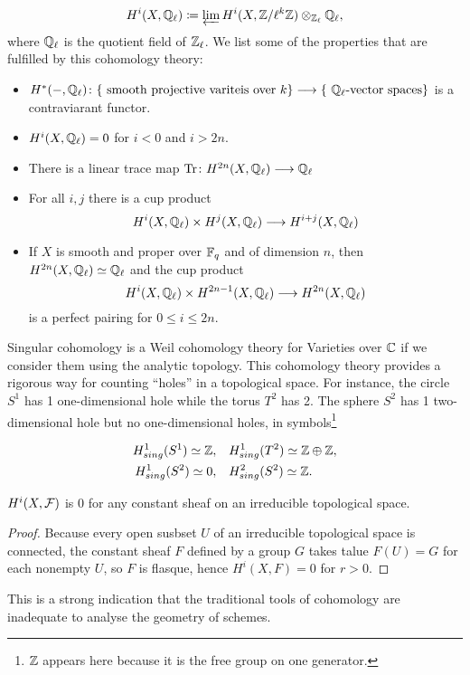 \[
	H^i(X,\mathbb{Q}_\ell) \coloneqq \varprojlim H^i(X, \mathbb{Z}/\ell^k \mathbb{Z}) \otimes_{\mathbb{Z}_\ell} \mathbb{Q}_\ell,
\]
where $\mathbb{Q}_\ell$ is the quotient field of $\mathbb{Z}_\ell$. We list some of the properties that are fulfilled by this cohomology theory:

\begin{itemize}
	\item $H^*(-, \mathbb{Q}_\ell) \colon \{ \text{ smooth projective variteis over } k \} \longrightarrow \{\text{ $\mathbb{Q}_\ell$-vector spaces}\}$
	      is a contraviarant functor.
	\item $H^i(X, \mathbb{Q}_\ell) = 0$ for $i<0$ and $i>2n$.
	\item There is a linear trace map $\operatorname{Tr} \colon H^{2n}(X, \mathbb{Q}_\ell) \longrightarrow \mathbb{Q}_\ell$
	\item For all $i,j$ there is a cup product
	      \[
		      H^i(X, \mathbb{Q}_\ell) \times H^j(X, \mathbb{Q}_\ell) \longrightarrow H^{i+j}(X, \mathbb{Q}_\ell)
	      \]
	\item If $X$ is smooth and proper over $\mathbb{F}_q$ and of dimension $n$, then $H^{2n}(X, \mathbb{Q}_\ell) \simeq \mathbb{Q}_\ell$ and the cup product
	      \[ H^i(X, \mathbb{Q}_\ell) \times H^{2n-1}(X, \mathbb{Q}_\ell) \longrightarrow H^{2n}(X, \mathbb{Q}_\ell)
	      \]
	      is a perfect pairing for $0 \le i \le 2n$.
\end{itemize}

Singular cohomology is a Weil cohomology theory for Varieties over $\mathbb{C}$ if we consider them using the analytic topology. This cohomology theory provides a rigorous way for counting ``holes'' in a topological space. For instance, the circle $S^1$ has 1 one-dimensional hole while the torus $T^2$ has 2. The sphere $S^2$ has 1 two-dimensional hole but no one-dimensional holes, in symbols\footnote{$\mathbb{Z}$ appears here because it is the free group on one generator.}

\begin{align*}
	H^1_{sing}(S^1) \simeq \mathbb{Z},\quad & H^1_{sing}(T^2) \simeq \mathbb{Z} \oplus \mathbb{Z}, \\
	H^1_{sing}(S^2) \simeq  0,\quad & H^2_{sing}(S^2) \simeq \mathbb{Z}.
\end{align*}

\begin{proposition}
	$H^i(X, \mathcal{F})$ is 0 for any constant sheaf on an irreducible topological space.
\end{proposition}

\begin{proof}
	Because every open susbset $U$ of an irreducible topological space is connected, the constant sheaf $F$ defined by a group $G$ takes talue $F(U) = G$ for each nonempty $U$, so $F$ is flasque, hence $H^i(X,F) = 0$ for $r>0$.
\end{proof}

This is a strong indication that the traditional tools of cohomology are inadequate to analyse the geometry of schemes.




